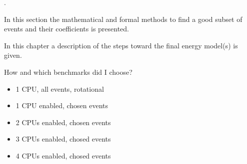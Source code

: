 .

\JWlfour{\JWTdd}


\JWlfour{\JWTbsle}



\label{sec:methods-of-analysis}

In this section the mathematical and formal methods to find a good subset of
events and their coefficients is presented.


\label{sec:towards-the-model}

In this chapter a description of the steps toward the final energy model(s) is
given.


\label{sec:benchmarks}

How and which benchmarks did I choose?



\begin{itemize}

\item 1 CPU, all events, rotational

\item 1 CPU enabled, chosen events

\item 2 CPUs enabled, chosen events

\item 3 CPUs enabled, chosed events

\item 4 CPUs enabled, chosed events

\end{itemize}



